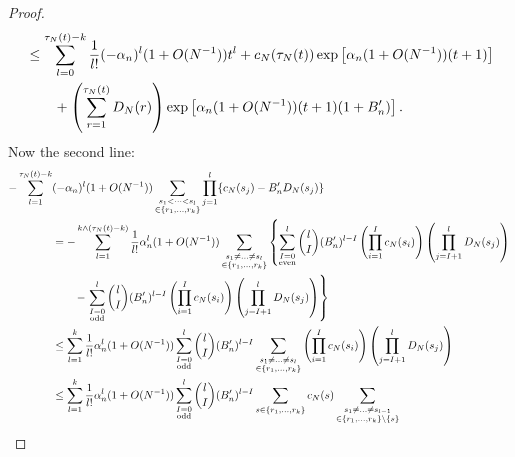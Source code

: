 \documentclass{article}
\newcommand{\1}[1]{\mathbbm{1}_{#1}}
\begin{document}
\begin{proof}
\begin{align}
&\leq \sum_{l=0}^{\tau_N(t) -k} \frac{1}{l!} (-\alpha_n)^l (1+O(N^{-1})) t^l
+ c_N(\tau_N(t)) \exp\left[ \alpha_n (1+O(N^{-1})) (t+1) \right] \notag\\
&\qquad+ \left( \sum_{r=1}^{\tau_N(t)} D_N(r) \right) \exp\left[ \alpha_n (1+O(N^{-1})) (t+1) (1+B_n^\prime) \right] %
 .
\end{align}
Now the second line:
\begin{align}
- \sum_{l=1}^{\tau_N(t) -k} &(-\alpha_n)^l (1+O(N^{-1}))
\sum_{\substack{s_1<\dots<s_l \\ \in \{r_1,\dots,r_k\} }}
\prod_{j=1}^l \{ c_N(s_j) - B_n^\prime D_N(s_j) \} \notag\\
&= - \sum_{l=1}^{k \wedge (\tau_N(t) -k)} \frac{1}{l!} \alpha_n^l (1+O(N^{-1}))
\sum_{\substack{s_1 \neq\dots\neq s_l \\ \in \{r_1,\dots,r_k\} }}
\left\{ \sum_{\substack{I=0\\\text{even} }}^l
\binom{l}{I} (B_n^\prime)^{l-I} 
\left( \prod_{i=1}^I c_N(s_i) \right) \left( \prod_{j=I+1}^l D_N(s_j) \right) 
\right. \notag\\
&\qquad- \left. \sum_{\substack{I=0 \\ \text{odd} }}^l
\binom{l}{I} (B_n^\prime)^{l-I} 
\left( \prod_{i=1}^I c_N(s_i) \right) \left( \prod_{j=I+1}^l D_N(s_j) \right) 
\right\} \notag\\
&\leq \sum_{l=1}^{k} \frac{1}{l!} \alpha_n^l (1+O(N^{-1}))
\sum_{\substack{I=0 \\ \text{odd} }}^l
\binom{l}{I} (B_n^\prime)^{l-I} 
\sum_{\substack{s_1 \neq\dots\neq s_l \\ \in \{r_1,\dots,r_k\} }}
\left( \prod_{i=1}^I c_N(s_i) \right) \left( \prod_{j=I+1}^l D_N(s_j) \right) \notag\\
&\leq \sum_{l=1}^{k} \frac{1}{l!} \alpha_n^l (1+O(N^{-1}))
\sum_{\substack{I=0 \\ \text{odd} }}^l
\binom{l}{I} (B_n^\prime)^{l-I} 
\sum_{s\in \{r_1,\dots,r_k\} } c_N(s)
\sum_{\substack{s_1 \neq\dots\neq s_{l-1} \\ \in \{r_1,\dots,r_k\}\setminus \{s\} }}

\end{align}
\end{proof}
\end{document}
